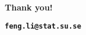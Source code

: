 \documentclass{beamer}
\begin{document}



\begin{frame}[plain]
  \addtocounter{framenumber}{-1}
  \begin{center}
    {\color{SUblue} \textbf{\Huge Thank you!}}

\vspace{1cm}

{\texttt{\textbf{feng.li@stat.su.se}}}
  \end{center}
\end{frame}
\end{document}

